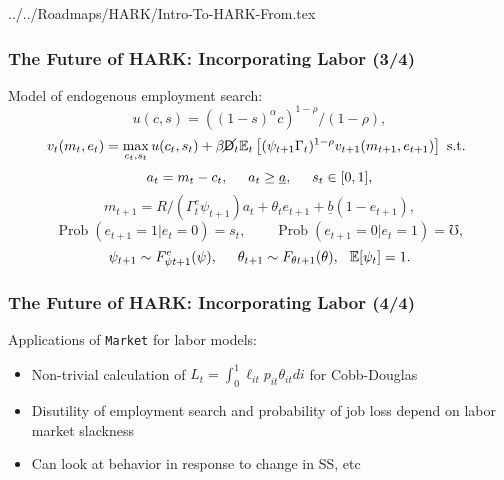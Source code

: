 \documentclass[11ptt]{beamer}
\newcommand{\Prob}{\operatorname{Prob}}
\newcommand{\bi}{\begin{itemize}}
\newcommand{\ei}{\end{itemize}}
\begin{document}
\begin{verbatimwrite}{../../Roadmaps/HARK/Intro-To-HARK-From.tex}
  \begin{frame}
    \frametitle{The Future of HARK: Incorporating Labor (3/4)}
    Model of endogenous employment search:
    \begin{equation*}
      u(c,s) = ((1-s)^\alpha c)^{1-\rho}/(1-\rho),
    \end{equation*}
    \begin{equation*}
      v_t(m_t,e_t) = \max_{c_t,s_t} u(c_t,s_t) + \beta \cancel{\mathsf{D}}_t \mathbb{E}_t \left[(\psi_{t+1} \Gamma_t)^{1-\rho} v_{t+1}(m_{t+1},e_{t+1}) \right] \text{ s.t. }
    \end{equation*}
    \begin{equation*}
      a_t = m_t - c_t, \hspace{0.5cm} a_t \geq \underline{a}, \hspace{0.5cm} s_t \in [0,1],
    \end{equation*}
    \begin{equation*}
      m_{t+1} = R/(\Gamma^e_t \psi_{t+1}) a_t + \theta_t e_{t+1} + \underline{b}(1-e_{t+1}), 
    \end{equation*}
    \begin{equation*}
      \Prob(e_{t+1} = 1 | e_t = 0) = s_t, \qquad \Prob(e_{t+1} = 0 | e_t = 1) = \mho,
    \end{equation*}
    \begin{equation*}
      \psi_{t+1} \sim F^e_{\psi t+1}(\psi), \hspace{0.5cm} \theta_{t+1} \sim F_{\theta t+1}(\theta), \hspace{0.25cm} \mathbb{E}[\psi_t] = 1.
    \end{equation*}
  \end{frame}



  \begin{frame}
    \frametitle{The Future of HARK: Incorporating Labor (4/4)}
    Applications of \texttt{Market} for labor models:
    \bi
  \item Non-trivial calculation of $L_t = \int_0^1 \ell_{it} p_{it} \theta_{it} di$ for Cobb-Douglas

  \item Disutility of employment search and probability of job loss depend on labor market slackness

  \item Can look at behavior in response to change in SS, etc
    \ei

    \hyperlink{DiscussionTopics}{}
  \end{frame}


\end{verbatimwrite}
\end{document}
